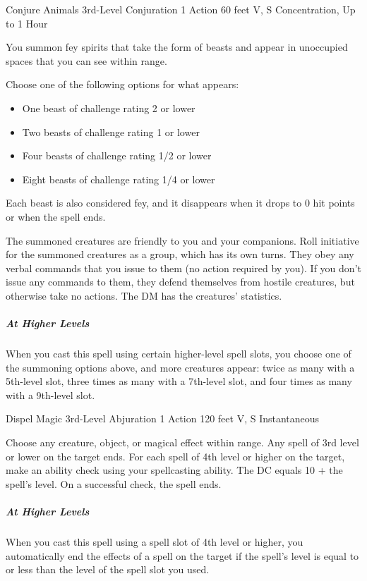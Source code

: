 {\DndSpellHeader
  {Conjure Animals}
  {3rd-Level Conjuration}
  {1 Action}
  {60 feet}
  {V, S}
  {Concentration, Up to 1 Hour}

You summon fey spirits that take the form of beasts and appear in unoccupied spaces that you can see within range.

Choose one of the following options for what appears:

\begin{itemize}
	\item One beast of challenge rating 2 or lower
	\item Two beasts of challenge rating 1 or lower
	\item Four beasts of challenge rating 1/2 or lower
	\item Eight beasts of challenge rating 1/4 or lower
\end{itemize}

Each beast is also considered fey, and it disappears when it drops to 0 hit points or when the spell ends.

The summoned creatures are friendly to you and your companions. Roll initiative for the summoned creatures as a group, which has its own turns. They obey any verbal commands that you issue to them (no action required by you). If you don't issue any commands to them, they defend themselves from hostile creatures, but otherwise take no actions. The DM has the creatures' statistics.

\subparagraph*{At Higher Levels} When you cast this spell using certain higher-level spell slots, you choose one of the summoning options above, and more creatures appear: twice as many with a 5th-level slot, three times as many with a 7th-level slot, and four times as many with a 9th-level slot.

\DndSpellHeader
  {Dispel Magic}
  {3rd-Level Abjuration}
  {1 Action}
  {120 feet}
  {V, S}
  {Instantaneous}

Choose any creature, object, or magical effect within range. Any spell of 3rd level or lower on the target ends. For each spell of 4th level or higher on the target, make an ability check using your spellcasting ability. The DC equals 10 + the spell's level. On a successful check, the spell ends.

\subparagraph*{At Higher Levels} When you cast this spell using a spell slot of 4th level or higher, you automatically end the effects of a spell on the target if the spell's level is equal to or less than the level of the spell slot you used.

}
